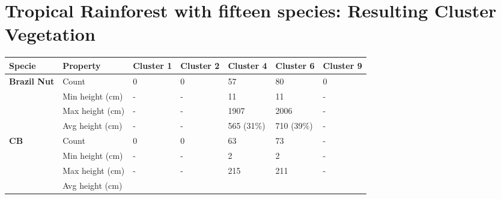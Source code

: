 \chapter{Tropical Rainforest with fifteen species: Resulting Cluster Vegetation } \label{AppendixH}


\begin{longtable}{|p{2cm}|p{2cm}|p{1.5cm}|p{1.5cm}|p{1.5cm}|p{1.5cm}|p{1.5cm}|}
		\hline	
		\textbf{Specie} & \textbf{Property} & \textbf{Cluster 1} & \textbf{Cluster 2} & \textbf{Cluster 4} & \textbf{Cluster 6} & \textbf{Cluster 9} \\
		\hline
		\multirow{4}{*}{\textbf{Brazil Nut}} & 
						\multicolumn{1}{l|}{Count} & 
						\multicolumn{1}{l|}{0} & 
						\multicolumn{1}{l|}{0} &
						\multicolumn{1}{l|}{57} & 
						\multicolumn{1}{l|}{80} &
						\multicolumn{1}{l|}{0} \\\cline{2-7} &
						\multicolumn{1}{l|}{Min height (cm)} & 
						\multicolumn{1}{l|}{-} & 
						\multicolumn{1}{l|}{-} &
						\multicolumn{1}{l|}{11} & 
						\multicolumn{1}{l|}{11} &
						\multicolumn{1}{l|}{-} \\\cline{2-7} &
						\multicolumn{1}{l|}{Max height (cm)} & 
						\multicolumn{1}{l|}{-} & 
						\multicolumn{1}{l|}{-} &
						\multicolumn{1}{l|}{1907} & 
						\multicolumn{1}{l|}{2006} &
						\multicolumn{1}{l|}{-} \\\cline{2-7} &
						\multicolumn{1}{l|}{Avg height (cm)} & 
						\multicolumn{1}{l|}{-} & 
						\multicolumn{1}{l|}{-} &
						\multicolumn{1}{l|}{565 (31\%) } & 
						\multicolumn{1}{l|}{710 (39\%)} & 
						\multicolumn{1}{l|}{-} \\\cline{2-7}
		\hline       
		\multirow{4}{*}{\textbf{CB}} & 
						\multicolumn{1}{l|}{Count} & 
						\multicolumn{1}{l|}{0} & 
						\multicolumn{1}{l|}{0} &
						\multicolumn{1}{l|}{63} & 
						\multicolumn{1}{l|}{73} &
						\multicolumn{1}{l|}{-} \\\cline{2-7} &
						\multicolumn{1}{l|}{Min height (cm)} & 
						\multicolumn{1}{l|}{-} & 
						\multicolumn{1}{l|}{-} &
						\multicolumn{1}{l|}{2} & 
						\multicolumn{1}{l|}{2} &
						\multicolumn{1}{l|}{-} \\\cline{2-7} &
						\multicolumn{1}{l|}{Max height (cm)} & 
						\multicolumn{1}{l|}{-} & 
						\multicolumn{1}{l|}{-} &
						\multicolumn{1}{l|}{215} & 
						\multicolumn{1}{l|}{211} &
						\multicolumn{1}{l|}{-} \\\cline{2-7} &
						\multicolumn{1}{l|}{Avg height (cm)} & 

\end{longtable}
